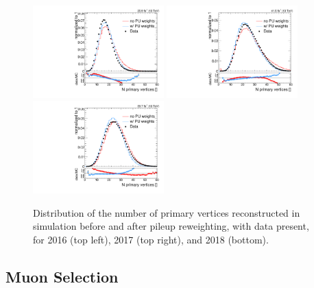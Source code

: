 \begin{figure}[htbp]
  \centering
  \includegraphics[width=0.45\textwidth]{fig/eventSelection/PUrewN_0_2016_nVert.pdf}
  \includegraphics[width=0.45\textwidth]{fig/eventSelection/PUrewN_0_2017_nVert.pdf}\\
  \includegraphics[width=0.45\textwidth]{fig/eventSelection/PUrewN_0_2018_nVert.pdf}
  \caption{
    Distribution of the number of primary vertices reconstructed in simulation before and after pileup reweighting, with data present, for 2016 (top left), 2017 (top right), and 2018 (bottom).
  }
  \label{fig:PUreweight}
\end{figure}

\subsection{Muon Selection}
\label{subsec:muonSelect}

